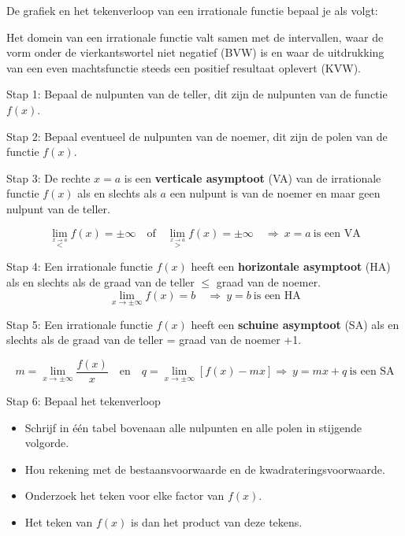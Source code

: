 \begin{ftonthoud}
	De grafiek en het tekenverloop van een irrationale functie bepaal
je als volgt:

Het domein van een irrationale functie valt samen met de intervallen,
waar de vorm onder de vierkantswortel niet negatief (BVW) is en waar
de uitdrukking van een even machtsfunctie steeds een positief resultaat
oplevert (KVW).

Stap 1: Bepaal de nulpunten van de teller, dit zijn de nulpunten van
de functie $f(x)$.

Stap 2: Bepaal eventueel de nulpunten van de noemer, dit zijn de polen
van de functie $f(x)$.

Stap 3: De rechte $x=a$ is een \textbf{verticale asymptoot} (VA)
van de irrationale functie $f(x)$ als en slechts als $a$ een nulpunt
is van de noemer en maar geen nulpunt van de teller.

\begin{equation*}
\lim_{\overset{x\rightarrow a}{<}}f(x)=\pm\infty\quad\textrm{of}\quad \lim_{\overset{x\rightarrow a}{>}}f(x)=\pm\infty\quad\Rightarrow\:x=a\:\textrm{is een VA}
\end{equation*}

Stap 4: Een irrationale functie $f(x)$ heeft een \textbf{horizontale
asymptoot} (HA) als en slechts als de graad van de teller \ensuremath{\le}
graad van de noemer.
\begin{equation*}
 \lim_{x\to\pm\infty}f(x)=b\quad\Rightarrow\:y=b\:\textrm{is een HA}
\end{equation*}


Stap 5: Een irrationale functie $f(x)$ heeft een \textbf{schuine
asymptoot} (SA) als en slechts als de graad van de teller = graad
van de noemer +1.

\begin{equation*}
m=\lim_{x\to\pm\infty}\frac{f(x)}{x}\quad\textrm{en}\quad q= \lim_{x\to\pm\infty}\left[f(x)-mx\right] \Rightarrow\:y=mx+q\:\textrm{is een SA}
\end{equation*}


Stap 6: Bepaal het tekenverloop

\begin{itemize}
\item Schrijf in \'e\'en tabel bovenaan alle nulpunten en alle polen in stijgende
volgorde.

\item Hou rekening met de bestaansvoorwaarde en de kwadrateringsvoorwaarde.

\item Onderzoek het teken voor elke factor van $f(x)$.

\item Het teken van $f(x)$ is dan het product van deze tekens.
\end{itemize}

\end{ftonthoud}